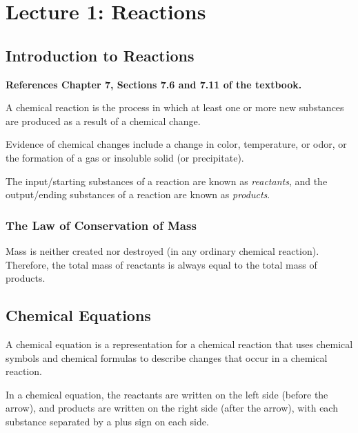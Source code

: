 \section{Lecture 1: Reactions}

\subsection{Introduction to Reactions}

\textbf{References Chapter 7, Sections 7.6 and 7.11 of the textbook.}

\begin{defn}
A chemical reaction is the process in which at least one or more new substances are produced as a result of a chemical change.
\end{defn}

\noindent
Evidence of chemical changes include a change in color, temperature, or odor, or the formation of a gas or insoluble solid (or precipitate).

\begin{defn}
The input/starting substances of a reaction are known as \textit{reactants}, and the output/ending substances of a reaction are known as \textit{products}.
\end{defn}

\subsubsection{The Law of Conservation of Mass}

\begin{defn}
Mass is neither created nor destroyed (in any ordinary chemical reaction). Therefore, the total mass of reactants is always equal to the total mass of products.
\end{defn}

\subsection{Chemical Equations}

\begin{defn}
A chemical equation is a representation for a chemical reaction that uses chemical symbols and chemical formulas to describe changes that occur in a chemical reaction.
\end{defn}

\noindent
In a chemical equation, the reactants are written on the left side (before the arrow), and products are written on the right side (after the arrow), with each substance separated by a plus sign on each side.

